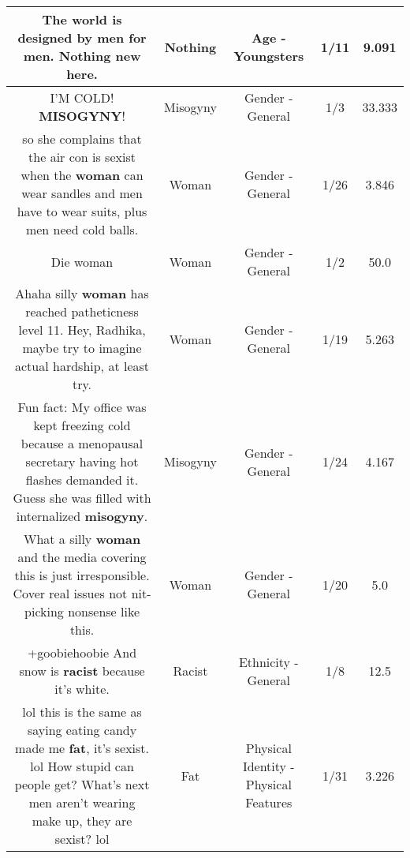 \documentclass[11pt]{article}
\newlength\mylength
\begin{document}
\begin{center}
\begin{longtable}{|C{.65\mylength}|C{.30\mylength}|C{.12\mylength}|C{.12\mylength}|C{.12\mylength}|}
  \small The world is designed by men for men. \textbf{Nothing} new here.\normalsize   & Nothing & Age - Youngsters & 1/11 & 9.091 \\  \hline
  \small I'M COLD! \textbf{MISOGYNY}!\normalsize   & Misogyny & Gender - General & 1/3 & 33.333 \\  \hline
  \small so she complains that the air con is sexist when the \textbf{woman} can wear sandles and men have to wear suits, plus men need cold balls.\normalsize   & Woman & Gender - General & 1/26 & 3.846 \\  \hline
  \small Die woman\normalsize   & Woman & Gender - General & 1/2 & 50.0 \\  \hline
  \small Ahaha silly \textbf{woman} has reached patheticness level 11. Hey, Radhika, maybe try to imagine actual hardship, at least try.\normalsize   & Woman & Gender - General & 1/19 & 5.263 \\  \hline
  \small Fun fact:  My office was kept freezing cold because a menopausal secretary having hot flashes demanded it.  Guess she was filled with internalized \textbf{misogyny}.\normalsize   & Misogyny & Gender - General & 1/24 & 4.167 \\  \hline
  \small What a silly \textbf{woman} and the media covering this is just irresponsible. Cover real issues not nit-picking nonsense like this.\normalsize   & Woman & Gender - General & 1/20 & 5.0 \\  \hline
  \small +goobiehoobie And snow is \textbf{racist} because it's white.\normalsize   & Racist & Ethnicity - General & 1/8 & 12.5 \\  \hline
  \small lol this is the same as saying eating candy made me \textbf{fat}, it's sexist. lol How stupid can people get? What's next men aren't wearing make up, they are sexist? lol\normalsize   & Fat & Physical Identity - Physical Features & 1/31 & 3.226 \\  \hline

\end{longtable}
\end{center}
\end{document}
